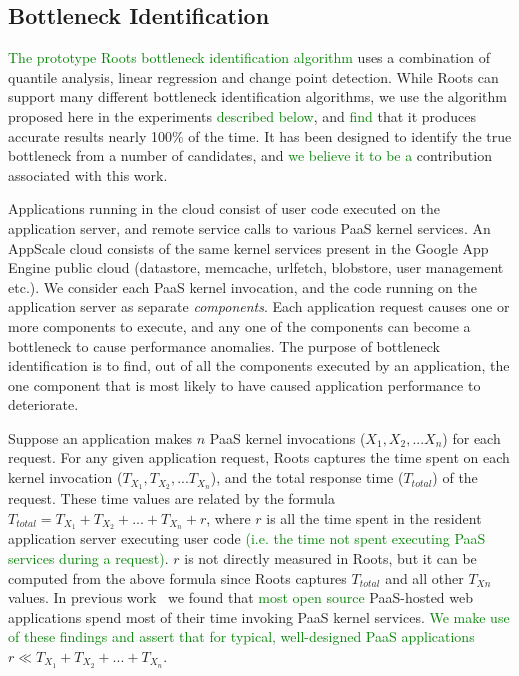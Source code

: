 \subsection{Bottleneck Identification}
\textcolor{green}{The prototype Roots bottleneck identification algorithm}
uses a combination
of quantile analysis, linear regression and change point detection. While Roots can
support many different bottleneck identification algorithms, we use
the algorithm proposed here in the
experiments \textcolor{green}{described below}, and 
\textcolor{green}{find}
that it produces accurate results nearly
100\% of the time. It has been 
designed to identify the true bottleneck from a number
of candidates, and 
\textcolor{green}{we believe it to be a}
contribution associated with this work.

Applications running in the cloud consist of user code executed on the application server, 
and remote service calls to various PaaS kernel services. An AppScale cloud
consists of the same kernel services present in the Google App Engine public cloud (datastore, memcache,
urlfetch, blobstore, user management etc.).
We consider each PaaS kernel invocation, and the code running on the application server as 
separate \textit{components}. Each application request causes one or more components to
execute, and any one of the components can become a bottleneck to cause performance anomalies.  
The purpose of bottleneck identification is to find, out of all
the components executed by an application, the one component that is most likely to have caused 
application performance to deteriorate.

Suppose an application makes $n$ PaaS kernel invocations ($X_1, X_2, ... X_n$) for each request. 
For any given application request,
Roots captures the time spent on each kernel invocation ($T_{X_1}, T_{X_2}, ... T_{X_n}$), and the 
total response time ($T_{total}$) of the request. These time values are related by the formula
$T_{total} = T_{X_1} + T_{X_2} + ... + T_{X_n} + r$, where $r$ is all the time spent in the resident 
application server executing user code \textcolor{green}{(i.e. the time not
spent executing PaaS services during a request)}. $r$ is not
directly measured in Roots, but it can be computed from the above formula 
since Roots captures $T_{total}$ and all other $T_{Xn}$ values. In previous
work~\cite{XXX} we found that 
\textcolor{green}{most open source}
PaaS-hosted web applications spend most of their time invoking PaaS kernel services.
\textcolor{green}{We make use of these findings and assert that for typical,
well-designed PaaS applications}
$r \ll T_{X_1} + T_{X_2} + ... + T_{X_n}$.

